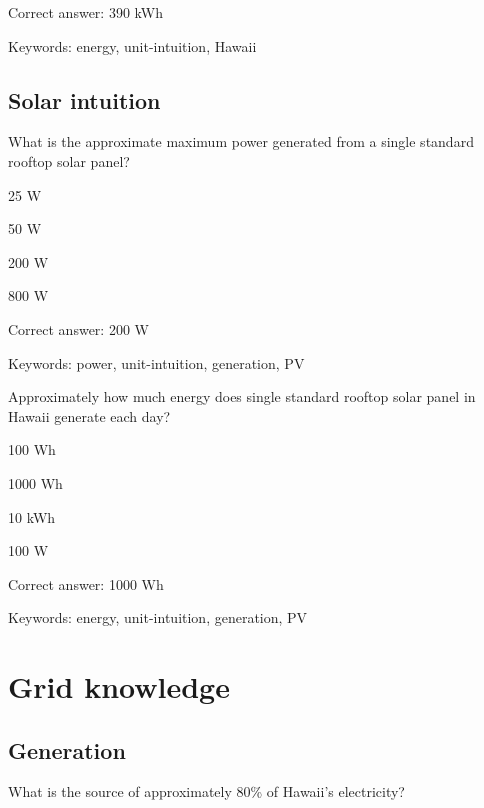 Correct answer: 390 kWh

Keywords: energy, unit-intuition, Hawaii 

\subsection{Solar intuition}

\begin{question}
	\item What is the approximate maximum power generated from a single standard rooftop solar panel?
\end{question}

\begin{answer}
	\item 25 W
	\item 50 W
	\item 200 W
	\item 800 W
\end{answer}

Correct answer: 200 W

Keywords: power, unit-intuition, generation, PV

\begin{question}
	\item Approximately how much energy does single standard rooftop solar panel in Hawaii generate each day?
\end{question}

\begin{answer}
	\item 100 Wh
	\item 1000 Wh
	\item 10 kWh
	\item 100 W
\end{answer}

Correct answer: 1000 Wh

Keywords: energy, unit-intuition, generation, PV


\section{Grid knowledge}

\subsection{Generation}

\begin{question}
	\item What is the source of approximately 80\% of Hawaii's electricity?
\end{question}

